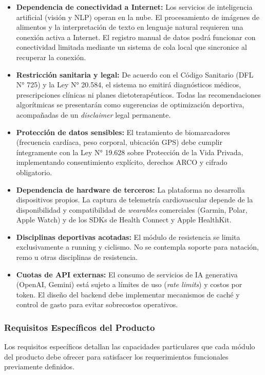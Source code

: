 \documentclass[12pt]{article}
\begin{document}
\begin{itemize}
    \item \textbf{Dependencia de conectividad a Internet:} Los servicios de inteligencia artificial (visión y NLP) operan en la nube. El procesamiento de imágenes de alimentos y la interpretación de texto en lenguaje natural requieren una conexión activa a Internet. El registro manual de datos podrá funcionar con conectividad limitada mediante un sistema de cola local que sincronice al recuperar la conexión.
    \item \textbf{Restricción sanitaria y legal:} De acuerdo con el Código Sanitario (DFL N° 725) y la Ley N° 20.584, el sistema no emitirá diagnósticos médicos, prescripciones clínicas ni planes dietoterapéuticos. Todas las recomendaciones algorítmicas se presentarán como sugerencias de optimización deportiva, acompañadas de un \textit{disclaimer} legal permanente.
    \item \textbf{Protección de datos sensibles:} El tratamiento de biomarcadores (frecuencia cardíaca, peso corporal, ubicación GPS) debe cumplir íntegramente con la Ley N° 19.628 sobre Protección de la Vida Privada, implementando consentimiento explícito, derechos ARCO y cifrado obligatorio.
    \item \textbf{Dependencia de hardware de terceros:} La plataforma no desarrolla dispositivos propios. La captura de telemetría cardiovascular depende de la disponibilidad y compatibilidad de \textit{wearables} comerciales (Garmin, Polar, Apple Watch) y de los SDKs de Health Connect y Apple HealthKit.
    \item \textbf{Disciplinas deportivas acotadas:} El módulo de resistencia se limita exclusivamente a running y ciclismo. No se contempla soporte para natación, remo u otras disciplinas de resistencia.
    \item \textbf{Cuotas de API externas:} El consumo de servicios de IA generativa (OpenAI, Gemini) está sujeto a límites de uso (\textit{rate limits}) y costos por token. El diseño del backend debe implementar mecanismos de caché y control de gasto para evitar sobrecostos operativos.
\end{itemize}
\newpage
\subsubsection{Requisitos Específicos del Producto}
Los requisitos específicos detallan las capacidades particulares que cada módulo del producto debe ofrecer para satisfacer los requerimientos funcionales previamente definidos.
\end{document}
